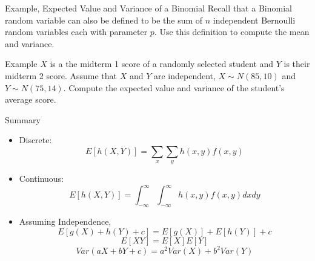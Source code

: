 \documentclass[t,handout]{beamer}
\begin{document}
\begin{frame}{Example, Expected Value and Variance of a Binomial}
    Recall that a Binomial random variable can also be defined to be the sum of $n$ independent Bernoulli random variables each with parameter $p$. Use this definition to compute the mean and variance.\\
\end{frame}
\begin{frame}{Example}
    $X$ is a the midterm 1 score of a randomly selected student and $Y$ is their midterm 2 score. Assume that $X$ and $Y$ are independent, $X\sim N(85,10)$ and $Y \sim N(75,14)$. Compute the expected value and variance of the student's average score.
\end{frame}
\begin{frame}{Summary}
    \begin{itemize}
        \item Discrete:$$ E[h(X,Y)] = \sum_{x} \sum_{y} h(x,y) f(x,y) $$
        \item Continuous: $$ E[h(X,Y)] = \int_{-\infty}^\infty \int_{-\infty}^\infty  h(x,y) f(x,y) dx dy$$
        \item Assuming Independence,
              $$E[g(X) + h(Y) + c] = E[g(X)]+E[h(Y)] +c$$
              $$E[XY] = E[X]E[Y]$$
              $$Var(aX + bY + c) = a^2Var(X) + b^2Var(Y)$$
    \end{itemize}
\end{frame}
\end{document}
